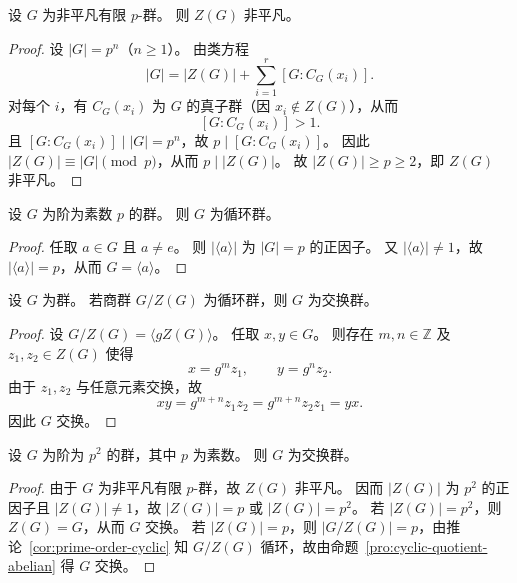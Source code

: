 \documentclass[lang=cn,a4paper,newtx]{elegantbook}
\begin{document}
\begin{corollary}
  设 $G$ 为非平凡有限 $p$-群。
  则 $Z(G)$ 非平凡。
\end{corollary}

\begin{proof}
  设 $|G|=p^n$（$n\ge 1$）。
  由类方程
  \[
    |G|=|Z(G)|+\sum_{i=1}^r [G:C_G(x_i)].
  \]
  对每个 $i$，有 $C_G(x_i)$ 为 $G$ 的真子群（因 $x_i\notin Z(G)$），从而
  \[
    [G:C_G(x_i)]>1.
  \]
  且 $[G:C_G(x_i)]\mid |G|=p^n$，故 $p\mid [G:C_G(x_i)]$。
  因此 $|Z(G)|\equiv |G|\pmod p$，从而 $p\mid |Z(G)|$。
  故 $|Z(G)|\ge p\ge 2$，即 $Z(G)$ 非平凡。
\end{proof}

\begin{corollary}\label{prime-order-cyclic}
  设 $G$ 为阶为素数 $p$ 的群。
  则 $G$ 为循环群。
\end{corollary}

\begin{proof}
  任取 $a\in G$ 且 $a\ne e$。
  则 $|\langle a\rangle|$ 为 $|G|=p$ 的正因子。
  又 $|\langle a\rangle|\ne 1$，故 $|\langle a\rangle|=p$，从而 $G=\langle a\rangle$。
\end{proof}

\begin{proposition}\label{cyclic-quotient-abelian}
  设 $G$ 为群。
  若商群 $G/Z(G)$ 为循环群，则 $G$ 为交换群。
\end{proposition}

\begin{proof}
  设 $G/Z(G)=\langle gZ(G)\rangle$。
  任取 $x,y\in G$。
  则存在 $m,n\in\mathbb Z$ 及 $z_1,z_2\in Z(G)$ 使得
  \[
    x=g^m z_1,\qquad y=g^n z_2.
  \]
  由于 $z_1,z_2$ 与任意元素交换，故
  \[
    xy=g^{m+n}z_1z_2=g^{m+n}z_2z_1=yx.
  \]
  因此 $G$ 交换。
\end{proof}

\begin{corollary}
  设 $G$ 为阶为 $p^2$ 的群，其中 $p$ 为素数。
  则 $G$ 为交换群。
\end{corollary}

\begin{proof}
  由于 $G$ 为非平凡有限 $p$-群，故 $Z(G)$ 非平凡。
  因而 $|Z(G)|$ 为 $p^2$ 的正因子且 $|Z(G)|\ne 1$，故 $|Z(G)|=p$ 或 $|Z(G)|=p^2$。
  若 $|Z(G)|=p^2$，则 $Z(G)=G$，从而 $G$ 交换。
  若 $|Z(G)|=p$，则 $|G/Z(G)|=p$，由推论~\ref{cor:prime-order-cyclic} 知 $G/Z(G)$ 循环，故由命题~\ref{pro:cyclic-quotient-abelian} 得 $G$ 交换。
\end{proof}
\end{document}
